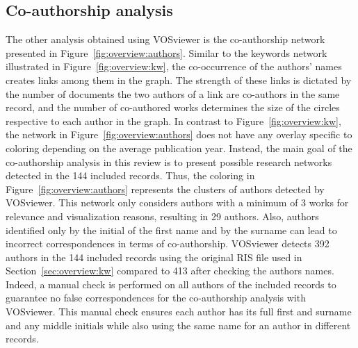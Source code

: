 \subsection{Co-authorship analysis}
\label{sec:overview:authors}

The other analysis obtained using VOSviewer is the co-authorship network presented in Figure~\ref{fig:overview:authors}. Similar to the keywords network illustrated in Figure~\ref{fig:overview:kw}, the co-occurrence of the authors' names creates links among them in the graph. The strength of these links is dictated by the number of documents the two authors of a link are co-authors in the same record, and the number of co-authored works determines the size of the circles respective to each author in the graph. 
In contrast to Figure~\ref{fig:overview:kw}, the network in Figure~\ref{fig:overview:authors} does not have any overlay specific to coloring depending on the average publication year. Instead, the main goal of the co-authorship analysis in this review is to present possible research networks detected in the 144 included records. Thus, the coloring in Figure~\ref{fig:overview:authors} represents the clusters of authors detected by VOSviewer. This network only considers authors with a minimum of 3 works for relevance and visualization reasons, resulting in 29 authors.
Also, authors identified only by the initial of the first name and by the surname can lead to incorrect correspondences in terms of co-authorship. VOSviewer detects 392 authors in the 144 included records using the original RIS file used in Section~\ref{sec:overview:kw} compared to 413 after checking the authors names. Indeed, a manual check is performed on all authors of the included records to guarantee no false correspondences for the co-authorship analysis with VOSviewer. This manual check ensures each author has its full first and surname and any middle initials while also using the same name for an author in different records.

